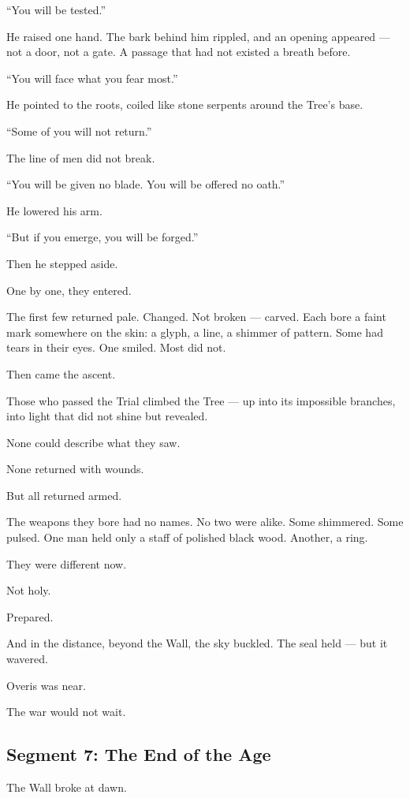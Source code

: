 \documentclass[9pt]{article}
\begin{document}
``You will be tested.''

He raised one hand. The bark behind him rippled, and an opening appeared — not a door, not a gate. A passage that had not existed a breath before.

``You will face what you fear most.''

He pointed to the roots, coiled like stone serpents around the Tree’s base.

``Some of you will not return.''

The line of men did not break.

``You will be given no blade. You will be offered no oath.''

He lowered his arm.

``But if you emerge, you will be forged.''

Then he stepped aside.

One by one, they entered.

The first few returned pale. Changed. Not broken — carved. Each bore a faint mark somewhere on the skin: a glyph, a line, a shimmer of pattern. Some had tears in their eyes. One smiled. Most did not.

Then came the ascent.

Those who passed the Trial climbed the Tree — up into its impossible branches, into light that did not shine but revealed.

None could describe what they saw.

None returned with wounds.

But all returned armed.

The weapons they bore had no names. No two were alike. Some shimmered. Some pulsed. One man held only a staff of polished black wood. Another, a ring.

They were different now.

Not holy.

Prepared.

And in the distance, beyond the Wall, the sky buckled. The seal held — but it wavered.

Overis was near.

The war would not wait.


\newpage

\subsection*{Segment 7: The End of the Age}

The Wall broke at dawn.
\end{document}
